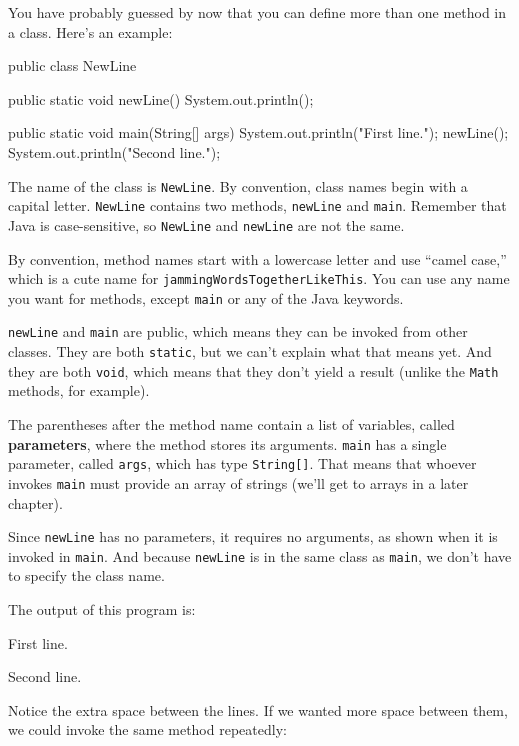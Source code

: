 \documentclass[12pt]{book}
\theoremstyle{exercise}
\newcommand{\java}[1]{\verb"#1"}
\newcommand{\java}[1]{\lstinline{#1}} %
\begin{document}
You have probably guessed by now that you can define more than one method in a class.
Here's an example:

\begin{code}
public class NewLine {

    public static void newLine() {
        System.out.println();
    }

    public static void main(String[] args) {
        System.out.println("First line.");
        newLine();
        System.out.println("Second line.");
    }
}
\end{code}

The name of the class is \java{NewLine}.
By convention, class names begin with a capital letter.
\java{NewLine} contains two methods, \java{newLine} and \java{main}.
Remember that Java is case-sensitive, so \java{NewLine} and \java{newLine} are not the same.

By convention, method names start with a lowercase letter and use ``camel case,'' which is a cute name for \java{jammingWordsTogetherLikeThis}.
You can use any name you want for methods, except \java{main} or any of the Java keywords.


\java{newLine} and \java{main} are public, which means they can be invoked from other classes.
They are both \java{static}, but we can't explain what that means yet.
And they are both \java{void}, which means that they don't yield a result (unlike the \java{Math} methods, for example).


The parentheses after the method name contain a list of variables, called {\bf parameters}, where the method stores its arguments.
\java{main} has a single parameter, called \java{args}, which has type \java{String[]}.
That means that whoever invokes \java{main} must provide an array of strings (we'll get to arrays in a later chapter).

Since \java{newLine} has no parameters, it requires no arguments, as shown when it is invoked in \java{main}.
And because \java{newLine} is in the same class as \java{main}, we don't have to specify the class name.

The output of this program is:

\begin{stdout}
First line.

Second line.
\end{stdout}

Notice the extra space between the lines.
If we wanted more space between them, we could invoke the same method repeatedly:
\end{document}
